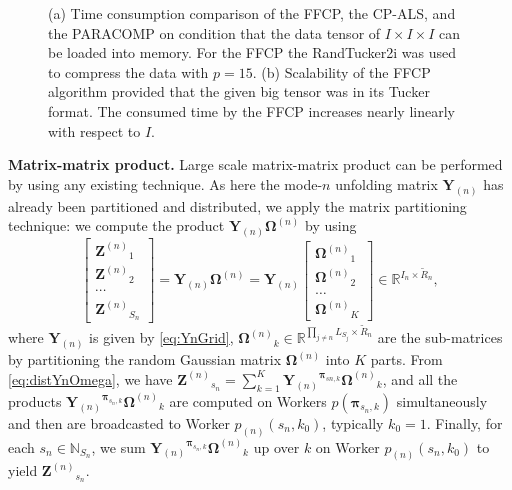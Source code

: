 \documentclass[10pt,twocolumn,twoside]{IEEEtran}
\newcommand{\tenmat}[2][n]{\ensuremath{{\mathbf{#2}}_{(#1)}}}
\newcommand{\matn}[2][n]{\ensuremath{\mathbf{#2}^{(#1)}}}
\newcommand{\Real}{\ensuremath{\mathbb{R}}}
\newcommand{\Natural}{\ensuremath{\mathbb{N}}}
\begin{document}
 \begin{figure*}[!t]
    \centerline{
    \hfil
    }
    \caption{(a) Time consumption comparison of the FFCP, the CP-ALS, and the PARACOMP on condition that the data tensor of $I\times I\times I$ can be loaded into memory. For the FFCP the RandTucker2i was used to compress the data with $p=15$. (b) Scalability of the FFCP algorithm provided that the given big tensor was in its Tucker format. The consumed time by the FFCP increases nearly linearly with respect to $I$.}
    \label{fig:scalability}
  \end{figure*}


{\bf Matrix-matrix product.} Large scale matrix-matrix product can be performed by using any existing technique. As here the mode-$n$ unfolding matrix \tenmat{Y} has already been partitioned and distributed, we apply the matrix partitioning technique: we compute the product $\tenmat{Y}\matn{\Omega}$ by using
\begin{equation}
\label{eq:distYnOmega}
\begin{bmatrix}
\matn{Z}_1 \\
\matn{Z}_2 \\
\cdots \\
\matn{Z}_{S_n}
\end{bmatrix}=
\tenmat{Y}\matn{\Omega}=\tenmat{Y}\begin{bmatrix}
\matn{\Omega}_1 \\ \matn{\Omega}_2 \\ \ldots \\\matn{\Omega}_K 
\end{bmatrix}
\in\Real^{I_n\times \tilde{R}_n},
\end{equation}
where \tenmat{Y} is given by \eqref{eq:YnGrid}, $\matn{\Omega}_k\in\Real^{\prod_{j\neq n}L_{S_j}\times \tilde{R}_n}$ are the sub-matrices by partitioning the random Gaussian matrix \matn{\Omega} into $K$ parts. From \eqref{eq:distYnOmega}, we have $\matn{Z}_{s_n}=\sum_{k=1}^K\tenmat{Y}^{\boldsymbol{\pi}_{sn,k}}\matn{\Omega}_k$, and all the products $\tenmat{Y}^{\boldsymbol{\pi}_{s_n,k}}\matn{\Omega}_k$ are computed on Workers $p(\boldsymbol{\pi}_{s_n,k})$ simultaneously and then  are broadcasted to  Worker $p_{(n)}(s_n,k_0)$, typically $k_0=1$. Finally, for each $s_n\in\Natural_{S_n}$, we sum $\tenmat{Y}^{\boldsymbol{\pi}_{s_n,k}}\matn{\Omega}_k$ up over $k$ on Worker  $p_{(n)}(s_n,k_0)$ to yield $\matn{Z}_{s_n}$.
\end{document}
